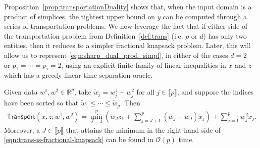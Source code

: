 \documentclass[smallextended]{svjour3}
\newcommand{\bbR}{\mathbb{R}}
\newcommand{\trans}{\mathsf{Transport}}
\newcommand{\tw}{\widetilde{w}}
\begin{document}
Proposition~\ref{prop:transportationDuality} shows that, when the input domain is a product of simplices, the tightest upper bound on $y$ can be computed through a series of transportation problems. We now leverage the fact that if either side of the transportation problem from Definition~\ref{def:trans} (i.e. $p$ or $d$) has only two entities, then it reduces to a simpler fractional knapsack problem.
Later, this will allow us to represent \eqref{eqn:sharp_dual_prod_simpl}, in either of the cases $d=2$ or $p_1=\cdots=p_{\tau}=2$, using an explicit finite family of linear inequalities in $x$ and $z$ which has a greedy linear-time separation oracle.
\begin{proposition} \label{prop:simplicesD2Explicit}
Given data $w^1, w^2 \in \bbR^p$, take $\tw_j = w^1_j-w^2_j$ for all $j\in\llbracket p\rrbracket$, and suppose the indices have been sorted so that
$\tw_1\le\cdots\le\tw_p$.
Then
\begin{align} \label{eqn:trans-is-fractional-knapsack}
\trans(x,z;w^1,w^2)=\min_{J=1}^{p}\left(\tw_Jz_1+\sum_{j=J+1}^{p}(\tw_j-\tw_J)x_j\right)+\sum_{j=1}^{p}w^2_jx_j.
\end{align}
Moreover, a $J \in \llbracket p \rrbracket$ that attains the minimum in the right-hand side of \eqref{eqn:trans-is-fractional-knapsack} can be found in $\mathcal{O}(p)$ time.
\end{proposition}
\end{document}
